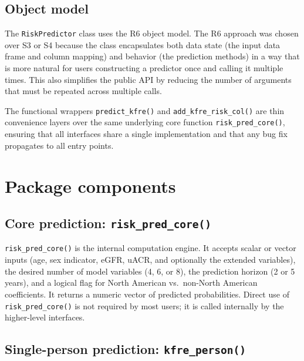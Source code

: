 \subsection{Object model}\label{object-model}

The \texttt{RiskPredictor} class uses the R6 object model. The R6 approach was chosen
over S3 or S4 because the class encapsulates both data state (the input data
frame and column mapping) and behavior (the prediction methods) in a way that is
more natural for users constructing a predictor once and calling it multiple
times. This also simplifies the public API by reducing the number of arguments
that must be repeated across multiple calls.

The functional wrappers \texttt{predict\_kfre()} and \texttt{add\_kfre\_risk\_col()} are thin
convenience layers over the same underlying core function \texttt{risk\_pred\_core()},
ensuring that all interfaces share a single implementation and that any bug fix
propagates to all entry points.

\section{Package components}\label{package-components}

\subsection{\texorpdfstring{Core prediction: \texttt{risk\_pred\_core()}}{Core prediction: risk\_pred\_core()}}\label{core-prediction-risk_pred_core}

\texttt{risk\_pred\_core()} is the internal computation engine. It accepts scalar or
vector inputs (age, sex indicator, eGFR, uACR, and optionally the extended
variables), the desired number of model variables (4, 6, or 8), the prediction
horizon (2 or 5 years), and a logical flag for North American vs.~non-North
American coefficients. It returns a numeric vector of predicted probabilities.
Direct use of \texttt{risk\_pred\_core()} is not required by most users; it is called
internally by the higher-level interfaces.

\subsection{\texorpdfstring{Single-person prediction: \texttt{kfre\_person()}}{Single-person prediction: kfre\_person()}}\label{single-person-prediction-kfre_person}


